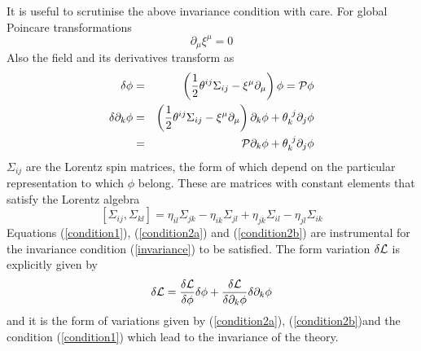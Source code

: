 \documentclass[12pt]{article}
\begin{document}
  It is useful to scrutinise the above invariance condition with care. 
For global Poincare transformations 
\begin{equation}
\partial_\mu\xi^\mu=0\label{condition1}
\end{equation}
Also 
the field and its derivatives transform as
\begin{eqnarray}
\delta\phi &=& \left(\frac{1}{2}\theta^{ij}\Sigma_{ij} - \xi^\mu\partial_\mu\right) \phi={\cal{P}}\phi\label{condition2a}\\
\delta\partial_k\phi &=& \left(\frac{1}{2}\theta^{ij}\Sigma_{ij} - \xi^\mu\partial_\mu\right)\partial_k\phi + \theta_k^{\ j}\partial_j\phi \nonumber\\
&=& {\cal{P}}\partial_k\phi + \theta_k^{\ j}\partial_j\phi\label{condition2b}
\end{eqnarray}
$\Sigma_{ij}$ are the Lorentz spin matrices, the form of which depend on the particular representation to which $\phi$ belong. These are matrices with constant elements that satisfy the Lorentz algebra
\begin{equation}
\left[\Sigma_{ij},\Sigma_{kl}\right] = \eta_{il}\Sigma_{jk} -
      \eta_{ik}\Sigma_{jl} + \eta_{jk} \Sigma_{il} - \eta_{jl}\Sigma_{ik}\label{algebra}  
\end{equation}
Equations (\ref{condition1}), (\ref{condition2a}) and (\ref{condition2b}) are instrumental for the invariance condition (\ref{invariance}) to be satisfied.  The form variation $\delta{\cal{L}}$ is explicitly given by
\begin{equation}
\label{lvariation}
\delta{\cal{L}}= \frac{\delta {\cal{L}}}{\delta\phi}\delta\phi + \frac{\delta {\cal{L}}}{\delta\partial_k\phi}\delta\partial_k\phi
\end{equation}
and it is the form of variations given by (\ref{condition2a}), (\ref{condition2b})and the condition (\ref{condition1}) which lead to the invariance of the theory. 
\end{document}
